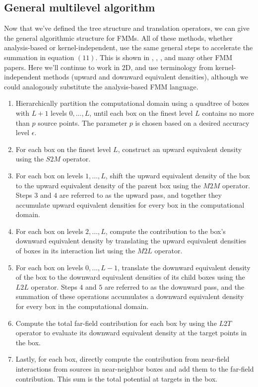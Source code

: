 \documentclass[11pt, oneside]{article}   	%
\begin{document}
\subsection{General multilevel algorithm}
Now that we've defined the tree structure and translation operators, we can give the general algorithmic structure for FMMs. All of these methods, whether analysis-based or kernel-independent, use the same general steps to accelerate the summation in equation $(11)$. This is shown in \cite{FD}, \cite{GR}, \cite{YBZ}, and many other FMM papers. Here we'll continue to work in 2D, and use terminology from kernel-independent methods (upward and downward equivalent densities), although we could analogously substitute the analysis-based FMM language.
\begin{enumerate}
\item Hierarchically partition the computational domain using a quadtree of boxes with $L+1$ levels $0,\dots,L$, until each box on the finest level $L$ contains no more than $p$ source points. The parameter $p$ is chosen based on a desired accuracy level $\epsilon$.
\item For each box on the finest level $L$, construct an upward equivalent density using the $S2M$ operator.
\item For each box on levels $1,\dots,L$, shift the upward equivalent density of the box to the upward equivalent density of the parent box using the $M2M$ operator. Steps $3$ and $4$ are referred to as the upward pass, and together they accumulate upward equivalent densities for every box in the computational domain.
\item For each box on levels $2,\dots,L$, compute the contribution to the box's downward equivalent density by translating the upward equivalent densities of boxes in its interaction list using the $M2L$ operator.
\item For each box on levels $0,\dots,L-1$, translate the downward equivalent density of the box to the downward equivalent densities of its child boxes using the $L2L$ operator. Steps $4$ and $5$ are referred to as the downward pass, and the summation of these operations accumulates a downward equivalent density for every box in the computational domain.
\item Compute the total far-field contribution for each box by using the $L2T$ operator to evaluate its downward equivalent density at the target points in the box.
\item Lastly, for each box, directly compute the contribution from near-field interactions from sources in near-neighbor boxes and add them to the far-field contribution. This sum is the total potential at targets in the box.
\end{enumerate}
\end{document}
